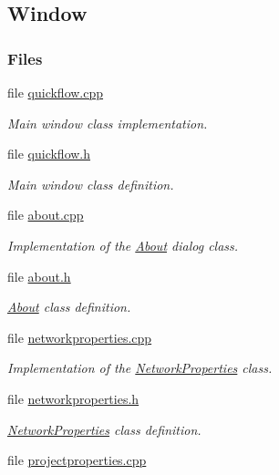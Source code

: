 \hypertarget{group___window}{}\subsection{Window}
\label{group___window}
\subsubsection*{Files}
\begin{DoxyCompactItemize}
\item 
file \hyperlink{quickflow_8cpp}{quickflow.\+cpp}
\begin{DoxyCompactList}\small\item\em Main window class implementation. \end{DoxyCompactList}\item 
file \hyperlink{quickflow_8h}{quickflow.\+h}
\begin{DoxyCompactList}\small\item\em Main window class definition. \end{DoxyCompactList}\item 
file \hyperlink{about_8cpp}{about.\+cpp}
\begin{DoxyCompactList}\small\item\em Implementation of the \hyperlink{class_about}{About} dialog class. \end{DoxyCompactList}\item 
file \hyperlink{about_8h}{about.\+h}
\begin{DoxyCompactList}\small\item\em \hyperlink{class_about}{About} class definition. \end{DoxyCompactList}\item 
file \hyperlink{networkproperties_8cpp}{networkproperties.\+cpp}
\begin{DoxyCompactList}\small\item\em Implementation of the \hyperlink{class_network_properties}{Network\+Properties} class. \end{DoxyCompactList}\item 
file \hyperlink{networkproperties_8h}{networkproperties.\+h}
\begin{DoxyCompactList}\small\item\em \hyperlink{class_network_properties}{Network\+Properties} class definition. \end{DoxyCompactList}\item 
file \hyperlink{projectproperties_8cpp}{projectproperties.\+cpp}

\end{DoxyCompactItemize}
